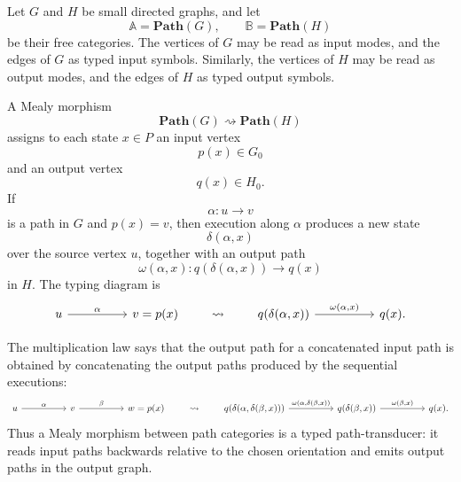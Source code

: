 \begin{example}
\label{example:typed-mealy-machines-path-categories}  
    Let \(G\) and \(H\) be small directed graphs, and let
    \[
        \mathbb A=\mathbf{Path}(G),
        \qquad
        \mathbb B=\mathbf{Path}(H)
    \]
    be their free categories. The vertices of \(G\) may be read as input modes,
    and the edges of \(G\) as typed input symbols. Similarly, the vertices of
    \(H\) may be read as output modes, and the edges of \(H\) as typed output
    symbols.
    
    A Mealy morphism
    \[
        \mathbf{Path}(G)\rightsquigarrow\mathbf{Path}(H)
    \]
    assigns to each state \(x\in P\) an input vertex
    \[
        p(x)\in G_0
    \]
    and an output vertex
    \[
        q(x)\in H_0.
    \]
    If
    \[
        \alpha:u\to v
    \]
    is a path in \(G\) and \(p(x)=v\), then execution along \(\alpha\) produces
    a new state
    \[
        \delta(\alpha,x)
    \]
    over the source vertex \(u\), together with an output path
    \[
        \omega(\alpha,x):q(\delta(\alpha,x))\to q(x)
    \]
    in \(H\). The typing diagram is
    \[
    \begin{tikzcd}[column sep=huge]
            {u}
                \arrow[r, "{\alpha}"]
        &
            {v=p(x)}
    \end{tikzcd}
    \qquad\leadsto\qquad
    \begin{tikzcd}[column sep=huge]
            {q(\delta(\alpha,x))}
                \arrow[r, "{\omega(\alpha,x)}"]
        &
            {q(x)}.
    \end{tikzcd}
    \]
    
    The multiplication law says that the output path for a concatenated input
    path is obtained by concatenating the output paths produced by the
    sequential executions:
    \[
    \begin{tikzcd}[column sep=huge]
            {u}
                \arrow[r, "{\alpha}"]
        &
            {v}
                \arrow[r, "{\beta}"]
        &
            {w=p(x)}
    \end{tikzcd}
    \qquad\leadsto\qquad
    \begin{tikzcd}[column sep=huge]
            {q(\delta(\alpha,\delta(\beta,x)))}
                \arrow[r, "{\omega(\alpha,\delta(\beta,x))}"]
        &
            {q(\delta(\beta,x))}
                \arrow[r, "{\omega(\beta,x)}"]
        &
            {q(x)}.
    \end{tikzcd}
    \]
    Thus a Mealy morphism between path categories is a typed path-transducer:
    it reads input paths backwards relative to the chosen orientation and emits
    output paths in the output graph.
    

\end{example}
